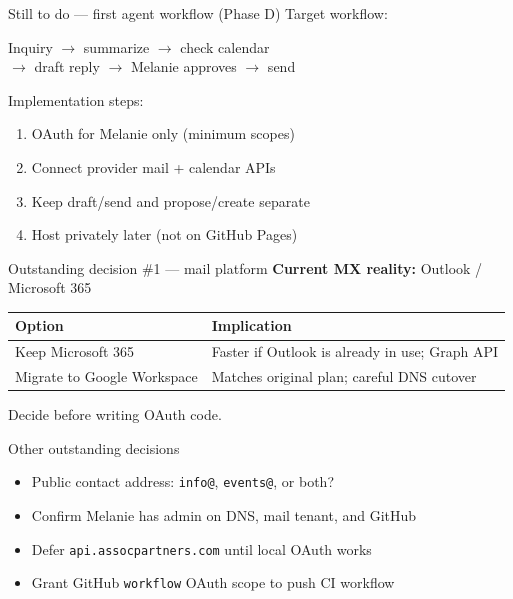 \documentclass[aspectratio=169,11pt]{beamer}
\begin{document}
\begin{frame}{Still to do --- first agent workflow (Phase D)}
  Target workflow:

  \begin{center}
    Inquiry $\rightarrow$ summarize $\rightarrow$ check calendar\\
    $\rightarrow$ draft reply $\rightarrow$ Melanie approves $\rightarrow$ send
  \end{center}

  \vspace{0.8em}
  Implementation steps:
  \begin{enumerate}
    \item OAuth for Melanie only (minimum scopes)
    \item Connect provider mail + calendar APIs
    \item Keep draft/send and propose/create separate
    \item Host privately later (not on GitHub Pages)
  \end{enumerate}
\end{frame}

\begin{frame}{Outstanding decision \#1 --- mail platform}
  \textbf{Current MX reality:} Outlook / Microsoft 365

  \vspace{0.6em}
  \begin{tabular}{p{}p{}}
    \toprule
    Option & Implication \\
    \midrule
    Keep Microsoft 365 & Faster if Outlook is already in use; Graph API \\
    Migrate to Google Workspace & Matches original plan; careful DNS cutover \\
    \bottomrule
  \end{tabular}

  \vspace{0.8em}
  \alert{Decide before writing OAuth code.}
\end{frame}

\begin{frame}{Other outstanding decisions}
  \begin{itemize}
    \item Public contact address: \texttt{info@}, \texttt{events@}, or both?
    \item Confirm Melanie has admin on DNS, mail tenant, and GitHub
    \item Defer \texttt{api.assocpartners.com} until local OAuth works
    \item Grant GitHub \texttt{workflow} OAuth scope to push CI workflow
  \end{itemize}
\end{frame}
\end{document}
